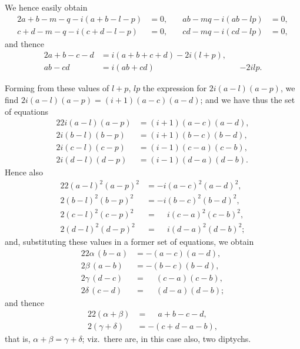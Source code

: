 \documentclass[11pt,a4paper]{article}
\theoremstyle{plain}
\theoremstyle{definition}
\begin{document}
We hence easily obtain
\begin{alignat*}{2}
a+b-m-q-i(a+b-l-p) &= 0, &\quad ab-mq-i(ab-lp) &= 0, \\
c+d-m-q-i(c+d-l-p) &= 0, &\quad cd-mq-i(cd-lp) &= 0,
\end{alignat*}
and thence
\begin{alignat*}{2}
a+b-c-d &= i(a+b+c+d) - 2i(l+p), \\
ab-cd &= i(ab+cd) &&- 2ilp.
\end{alignat*}

Forming from these values of $l+p$, $lp$ the expression for $2i(a-l)(a-p)$, we find $2i(a-l)(a-p) = (i+1)(a-c)(a-d)$; and we have thus the set of equations
\begin{alignat*}{2}
2i(a-l)(a-p) &= (i+1)(a-c)(a-d), \\
2i(b-l)(b-p) &= (i+1)(b-c)(b-d), \\
2i(c-l)(c-p) &= (i-1)(c-a)(c-b), \\
2i(d-l)(d-p) &= (i-1)(d-a)(d-b).
\end{alignat*}
Hence also
\begin{alignat*}{2}
2(a-l)^2 (a-p)^2 &= -i(a-c)^2 (a-d)^2, \\
2(b-l)^2 (b-p)^2 &= -i(b-c)^2 (b-d)^2, \\
2(c-l)^2 (c-p)^2 &= \phantom{-}i(c-a)^2 (c-b)^2, \\
2(d-l)^2 (d-p)^2 &= \phantom{-}i(d-a)^2 (d-b)^2;
\end{alignat*}
and, substituting these values in a former set of equations, we obtain
\begin{alignat*}{2}
2\alpha\, (b-a) &= -(a-c)(a-d), \\
2\beta\, (a-b) &= -(b-c)(b-d), \\
2\gamma\, (d-c) &= \phantom{-}(c-a)(c-b), \\
2\delta\, (c-d) &= \phantom{-}(d-a)(d-b);
\end{alignat*}
and thence
\begin{alignat*}{2}
2(\alpha+\beta) &= \phantom{-}a+b-c-d, \\
2(\gamma+\delta) &= -(c+d-a-b),
\end{alignat*}
that is, $\alpha+\beta = \gamma+\delta$; viz.\ there are, in this case also, two diptychs.
\end{document}

